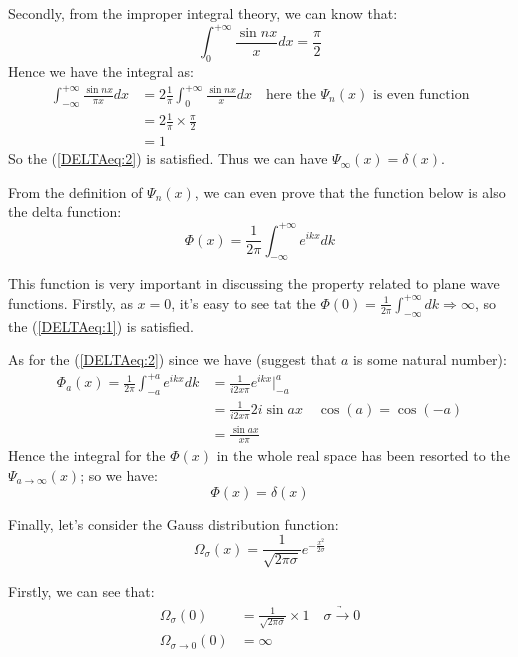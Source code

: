 Secondly, from the improper integral theory, we can know that:
\begin{equation}\label{}
\int_{0}^{+\infty}\frac{\sin nx}{x}dx = \frac{\pi}{2}
\end{equation}
Hence we have the integral as:
\begin{align}\label{}
\int_{-\infty}^{+\infty}\frac{\sin nx}{\pi x}dx &=
2\frac{1}{\pi}\int_{0}^{+\infty}\frac{\sin nx}{x}dx \quad
 \text{here the $\Psi_{n}(x)$ is even function}\nonumber \\
&=2\frac{1}{\pi}\times\frac{\pi}{2} \nonumber \\
&=1
\end{align}
So the (\ref{DELTAeq:2}) is satisfied. Thus we can have
$\Psi_{\infty}(x) = \delta(x)$.

From the definition of $\Psi_{n}(x)$, we can even prove that the
function below is also the delta function:
\begin{equation}\label{}
\Phi(x) = \frac{1}{2\pi}\int_{-\infty}^{+\infty} e^{ikx}dk
\end{equation}

This function is very important in discussing the property related
to plane wave functions. Firstly, as $x = 0$, it's easy to see tat
the $\Phi(0) = \frac{1}{2\pi}\int_{-\infty}^{+\infty} dk \Rightarrow
\infty$, so the (\ref{DELTAeq:1}) is satisfied.

As for the (\ref{DELTAeq:2}) since we have (suggest that $a$ is some
natural number):
\begin{align}\label{}
\Phi_{a}(x) = \frac{1}{2\pi}\int_{-a}^{+a} e^{ikx}dk &=
\frac{1}{i2x\pi}e^{ikx}\Big|^{a}_{-a} \nonumber \\
&=\frac{1}{i2x\pi}2i\sin ax \quad \cos(a) = \cos(-a)\nonumber \\
&=\frac{\sin ax}{x\pi}
\end{align}
Hence the integral for the $\Phi(x)$ in the whole real space has
been resorted to the $\Psi_{a\rightarrow \infty}(x)$; so we have:
\begin{equation}\label{}
\Phi(x) = \delta(x)
\end{equation}

Finally, let's consider the Gauss distribution function:
\begin{equation}\label{}
\Omega_{\sigma}(x) =
\frac{1}{\sqrt{2\pi\sigma}}e^{-\frac{x^{2}}{2\sigma}}
\end{equation}

Firstly, we can see that:
\begin{align}\label{}
\Omega_{\sigma}(0) &= \frac{1}{\sqrt{2\pi\sigma}}\times 1 \quad
\underrightarrow{\sigma \rightarrow 0} \nonumber
\\
\Omega_{\sigma \rightarrow 0 }(0) &= \infty
\end{align}

